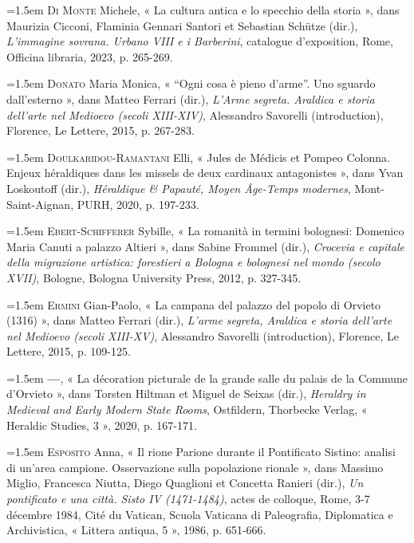 \documentclass[12pt,twoside,openany]{book}
\newenvironment{PurhBibliography}
  {%
    \par
    \setlength{\parindent}{0pt}%
    \setlength{\leftskip}{0pt}%
  }
  {%
    \par
  }
\begin{document}
\begin{PurhBibliography}
\noindent\hangindent=1.5em \textsc{Di Monte} Michele, « La cultura antica e lo specchio della storia », dans Maurizia Cicconi, Flaminia Gennari Santori et Sebastian Schütze (dir.), \textit{L’immagine sovrana. Urbano VIII e i Barberini}, catalogue d’exposition, Rome, Officina libraria, 2023, p. 265-269.\par
\noindent\hangindent=1.5em \textsc{Donato} Maria Monica, « “Ogni cosa è pieno d’arme”. Uno sguardo dall’esterno », dans Matteo Ferrari (dir.), \textit{L’Arme segreta. Araldica e storia dell’arte nel Medioevo (secoli XIII-XIV)}, Alessandro Savorelli (introduction), Florence, Le Lettere, 2015, p. 267-283.\par
\noindent\hangindent=1.5em \textsc{Doulkaridou}-\textsc{Ramantani} Elli, « Jules de Médicis et Pompeo Colonna. Enjeux héraldiques dans les missels de deux cardinaux antagonistes », dans Yvan Loskoutoff (dir.), \textit{Héraldique \& Papauté, Moyen Âge-Temps modernes}, Mont-Saint-Aignan, PURH, 2020, p. 197-233.\par
\noindent\hangindent=1.5em \textsc{Ebert}-\textsc{Schifferer} Sybille, « La romanità in termini bolognesi: Domenico Maria Canuti a palazzo Altieri », dans Sabine Frommel (dir.), \textit{Crocevia e capitale della migrazione artistica: forestieri a Bologna e bolognesi nel mondo (secolo XVII)}, Bologne, Bologna University Press, 2012, p. 327-345.\par
\noindent\hangindent=1.5em \textsc{Ermini} Gian-Paolo, « La campana del palazzo del popolo di Orvieto (1316) », dans Matteo Ferrari (dir.), \textit{L’arme segreta, Araldica e storia dell’arte nel Medioevo (secoli XIII-XV)}, Alessandro Savorelli (introduction), Florence, Le Lettere, 2015, p. 109-125.\par
\noindent\hangindent=1.5em \textbf{—}, « La décoration picturale de la grande salle du palais de la Commune d’Orvieto », dans Torsten Hiltman et Miguel de Seixas (dir.), \textit{Heraldry in Medieval and Early Modern State Rooms}, Ostfildern, Thorbecke Verlag, « Heraldic Studies, 3 », 2020, p. 167-171.\par
\noindent\hangindent=1.5em \textsc{Esposito} Anna, « Il rione Parione durante il Pontificato Sistino: analisi di un’area campione. Osservazione sulla popolazione rionale », dans Massimo Miglio, Francesca Niutta, Diego Quaglioni et Concetta Ranieri (dir.), \textit{Un pontificato e una città. Sisto IV (1471-1484)}, actes de colloque, Rome, 3-7 décembre 1984, Cité du Vatican, Scuola Vaticana di Paleografia, Diplomatica e Archivistica, « Littera antiqua, 5 », 1986, p. 651-666.\par

\end{PurhBibliography}
\end{document}
